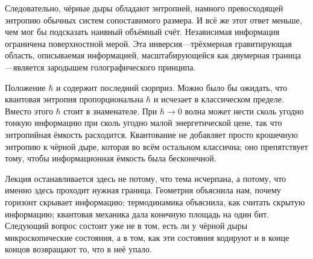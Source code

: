 Следовательно, чёрные дыры обладают энтропией, намного превосходящей энтропию обычных систем сопоставимого размера. И всё же этот ответ меньше, чем мог бы подсказать наивный объёмный счёт. Независимая информация ограничена поверхностной мерой. Эта инверсия---трёхмерная гравитирующая область, описываемая информацией, масштабирующейся как двумерная граница---является зародышем голографического принципа.

\begin{classroomqa}
\end{classroomqa}

Положение \(\hbar\) и содержит последний сюрприз. Можно было бы ожидать, что квантовая энтропия пропорциональна \(\hbar\) и исчезает в классическом пределе. Вместо этого \(\hbar\) стоит в знаменателе. При \(\hbar\to0\) волна может нести сколь угодно тонкую информацию при сколь угодно малой энергетической цене, так что энтропийная ёмкость расходится. Квантование не добавляет просто крошечную энтропию к чёрной дыре, которая во всём остальном классична; оно препятствует тому, чтобы информационная ёмкость была бесконечной.

\begin{classroomqa}
\end{classroomqa}

Лекция останавливается здесь не потому, что тема исчерпана, а потому, что именно здесь проходит нужная граница. Геометрия объяснила нам, почему горизонт скрывает информацию; термодинамика объяснила, как считать скрытую информацию; квантовая механика дала конечную площадь на один бит. Следующий вопрос состоит уже не в том, есть ли у чёрной дыры микроскопические состояния, а в том, как эти состояния кодируют и в конце концов возвращают то, что в неё упало.
